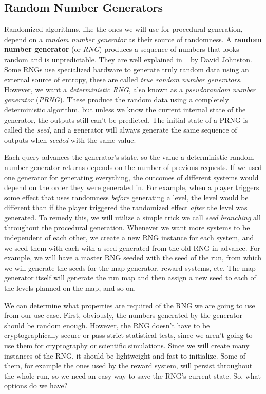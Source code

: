 \subsection{Random Number Generators}

Randomized algorithms, like the ones we will use for procedural generation, depend on a \emph{random number generator} as their source of randomness.
A \textbf{random number generator} (or \emph{RNG}) produces a sequence of numbers that looks random and is unpredictable.
They are well explained in ~\cite{johnston2018random} by David Johnston.
Some RNGs use specialized hardware to generate truly random data using an external source of entropy, these are called \emph{true random number generators}.
However, we want a \emph{deterministic RNG}, also known as a \emph{pseudorandom number generator} (\emph{PRNG}).
These produce the random data using a completely deterministic algorithm, but unless we know the current internal state of the generator, the outputs still can't be predicted.
The initial state of a PRNG is called the \emph{seed}, and a generator will always generate the same sequence of outputs when \emph{seeded} with the same value.

Each query advances the generator's state, so the value a deterministic random number generator returns depends on the number of previous requests.
If we used one generator for generating everything, the outcomes of different systems would depend on the order they were generated in.
For example, when a player triggers some effect that uses randomness \emph{before} generating a level, the level would be different than if the player triggered the randomized effect \emph{after} the level was generated.
To remedy this, we will utilize a simple trick we call \emph{seed branching} all throughout the procedural generation.
Whenever we want more systems to be independent of each other, we create a new RNG instance for each system, and we seed them with each with a seed generated from the old RNG in advance.
For example, we will have a master RNG seeded with the seed of the run, from which we will generate the seeds for the map generator, reward systems, etc.
The map generator itself will generate the run map and then assign a new seed to each of the levels planned on the map, and so on.

We can determine what properties are required of the RNG we are going to use from our use-case.
First, obviously, the numbers generated by the generator should be random enough.
However, the RNG doesn't have to be cryptographically secure or pass strict statistical tests, since we aren't going to use them for cryptography or scientific simulations.
Since we will create many instances of the RNG, it should be lightweight and fast to initialize.
Some of them, for example the ones used by the reward system, will persist throughout the whole run, so we need an easy way to save the RNG's current state.
So, what options do we have?

